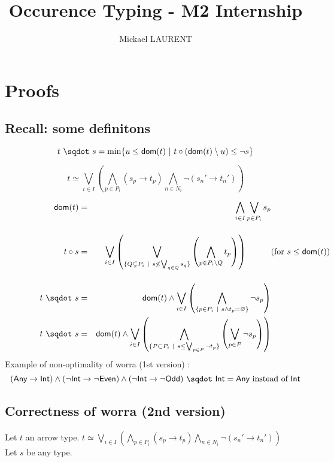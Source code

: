\documentclass[a4paper]{article}%
\title{\vspace{1.5cm}Occurence Typing - M2 Internship}
\author{Mickael LAURENT}
\date{\vspace{-5ex}}
\newcommand{\worra}[2]{#1\mathop{\,\sqdot\,} #2}
\newcommand{\apply}[2]{#1\circ#2}
\newcommand{\dom}[1]{\textsf{dom}(#1)}
\newcommand{\alt}{~|~}
\newcommand{\Any} {\textsf{Any}}%
\newcommand{\Int} {\textsf{Int}}
\newcommand{\Even} {\textsf{Even}}
\newcommand{\Odd} {\textsf{Odd}}
\begin{document}
	\maketitle

    \section{Proofs}

    \subsection{Recall: some definitons}

    \[ \worra t s = \min \{ u \leq \dom t \alt \apply t {(\dom t \setminus u)} \leq \neg s \} \]

    \[ t \simeq \bigvee_{i\in I}\left(\bigwedge_{p\in P_i}(s_p\to t_p)\bigwedge_{n\in N_i}\neg(s_n'\to t_n')\right) \]

    \begin{eqnarray*}
        \dom{t}    & = & \bigwedge_{i\in I}\bigvee_{p\in P_i}s_p\\[4mm]
        \apply t s & = & \bigvee_{i\in I}\left(\bigvee_{\{Q\subsetneq P_i\alt s\not\leq\bigvee_{q\in Q}s_q\}}\left(\bigwedge_{p\in P_i\setminus Q}t_p\right)\right)\hspace*{1cm}\makebox[0cm][l]{(for $s\leq\dom{t}$)}\\[4mm]
        \worra t s & = & \dom t \wedge\bigvee_{i\in I}\left(\bigwedge_{\{p\in P_i\alt s\wedge t_p=\varnothing\}}\neg s_p \right)\\
        \worra t s & = & \dom t \wedge\bigvee_{i\in I}\left(\bigwedge_{\{P \subset P_i\alt s \leq \bigvee_{p \in P} \neg t_p\}} \left(\bigvee_{p \in P} \neg s_p \right)\right)
    \end{eqnarray*}
    Example of non-optimality of worra (1st version) :
    \[ \worra {(\Any \rightarrow \Int) \land (\neg \Int \rightarrow \neg \Even) \land (\neg \Int \rightarrow \neg \Odd)} \Int = \Any \text{ instead of } \Int \]
    \pagebreak

    \subsection{Correctness of worra (2nd version)}
    
    Let $t$ an arrow type. $t \simeq \bigvee_{i\in I}\left(\bigwedge_{p\in P_i}(s_p\to t_p)\bigwedge_{n\in N_i}\neg(s_n'\to t_n')\right)$\\
    Let $s$ be any type.
\end{document}
